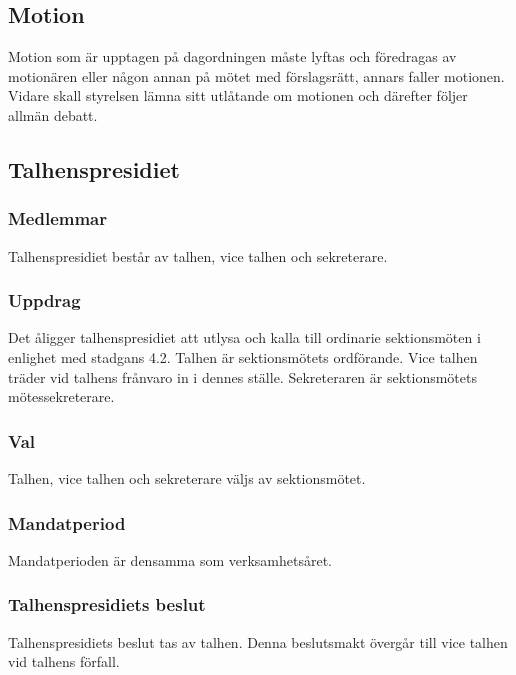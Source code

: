 \subsection{Motion} 
Motion som är upptagen på dagordningen måste lyftas och föredragas av motionären eller någon annan på mötet med förslagsrätt, annars faller motionen. Vidare skall styrelsen lämna sitt utlåtande om motionen och därefter följer allmän debatt. 
\subsection{Talhenspresidiet}
\subsubsection{Medlemmar}
Talhenspresidiet består av talhen, vice talhen och sekreterare.
\subsubsection{Uppdrag}
Det åligger talhenspresidiet att utlysa och kalla till ordinarie sektionsmöten i enlighet med stadgans 4.2. Talhen är sektionsmötets ordförande. Vice talhen träder vid talhens frånvaro in i dennes ställe. Sekreteraren är sektionsmötets mötessekreterare.
\subsubsection{Val}
Talhen, vice talhen och sekreterare väljs av sektionsmötet.
\subsubsection{Mandatperiod}
Mandatperioden är densamma som verksamhetsåret.
\subsubsection{Talhenspresidiets beslut}
Talhenspresidiets beslut tas av talhen. Denna beslutsmakt övergår till
vice talhen vid talhens förfall.

\newpage

